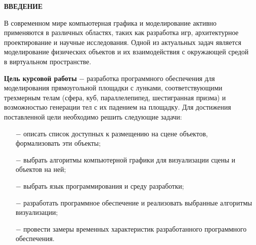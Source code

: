 \begin{center}
    \textbf{ВВЕДЕНИЕ}
\end{center}

В современном мире компьютерная графика и моделирование активно применяются в различных областях, таких как разработка игр, архитектурное проектирование и научные исследования. Одной из актуальных задач является моделирование физических объектов и их взаимодействия с окружающей средой в виртуальном пространстве.

\textbf{Цель курсовой работы} $-$ разработка программного обеспечения для моделирования прямоугольной площадки с лунками, соответствующими трехмерным телам (сфера, куб, параллелепипед, шестигранная призма) и возможностью генерации тел с их падением на площадку. Для достижения поставленной цели необходимо решить следующие задачи:

\begin{itemize}
	\item[$-$] описать список доступных к размещению на сцене объектов, формализовать эти объекты;
	\item[$-$] выбрать алгоритмы компьютерной графики для визуализации сцены и объектов на ней;
	\item[$-$] выбрать язык программирования и среду разработки;
    \item[$-$] разработать программное обеспечение и реализовать выбранные алгоритмы визуализации;
    \item[$-$] провести замеры временных характеристик разработанного программного обеспечения.
\end{itemize}